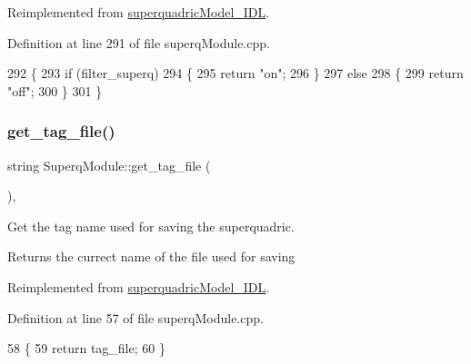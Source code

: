 Reimplemented from \mbox{\hyperlink{classsuperquadricModel__IDL_af99d29d42b96b8db6c90c5fd48cfb253}{superquadric\+Model\+\_\+\+I\+DL}}.



Definition at line 291 of file superq\+Module.\+cpp.


\begin{DoxyCode}
292 \{
293     \textcolor{keywordflow}{if} (filter_superq)
294     \{
295         \textcolor{keywordflow}{return} \textcolor{stringliteral}{"on"};
296     \}
297     \textcolor{keywordflow}{else}
298     \{
299         \textcolor{keywordflow}{return} \textcolor{stringliteral}{"off"};
300     \}
301 \}
\end{DoxyCode}
\mbox{\label{classSuperqModule_ac5475155a5a1b05e5fdef54699cef1a6}} 
\subsubsection{\texorpdfstring{get\+\_\+tag\+\_\+file()}{get\_tag\_file()}}
{\footnotesize\ttfamily string Superq\+Module\+::get\+\_\+tag\+\_\+file (\begin{DoxyParamCaption}{ }\end{DoxyParamCaption})\hspace{0.3cm}{\ttfamily [protected]}, {\ttfamily [virtual]}}



Get the tag name used for saving the superquadric. 

\begin{DoxyReturn}{Returns}
the currect name of the file used for saving 
\end{DoxyReturn}


Reimplemented from \mbox{\hyperlink{classsuperquadricModel__IDL_a6d39eaa247aec65fe2bfefbdace4ec85}{superquadric\+Model\+\_\+\+I\+DL}}.



Definition at line 57 of file superq\+Module.\+cpp.


\begin{DoxyCode}
58 \{
59     \textcolor{keywordflow}{return} tag_file;
60 \}
\end{DoxyCode}
\mbox{\label{classSuperqModule_a89be4778051c4dd19339021448f89b41}} 
